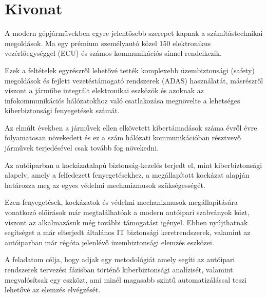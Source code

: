 \setcounter{page}{1}

\selecthungarian

\chapter*{Kivonat}

A modern gépjárművekben egyre jelentősebb szerepet kapnak a számítástechnikai megoldások. Ma egy prémium személyautó közel 150 elektronikus vezérlőegységgel (ECU) és számos kommunikációs sínnel rendelkezik. 

Ezek a feltételek egyrészről lehetővé tették komplexebb üzembiztonsági (safety) megoldások és fejlett vezetéstámogató rendszerek (ADAS) használatát, másrészről viszont a járműbe integrált elektronikai eszközök és azoknak az infokommunikációs hálózatokhoz való csatlakozása megnövelte a lehetséges kiberbiztonsági fenyegetések számát.

Az elmúlt években a járművek ellen elkövetett kibertámadások száma évről évre folyamatosan növekedett és ez a szám hálózati kommunikációban résztvevő járművek terjedésével csak tovább fog növekedni.

Az autóiparban a kockázatalapú biztonság-kezelés terjedt el, mint kiberbiztonsági alapelv, amely a felfedezett fenyegetésekhez, a megállapított kockázat alapján határozza meg az egyes védelmi mechanizmusok szükségességét.

Ezen fenyegetések, kockázatok és védelmi mechanizmusok megállapítására vonatkozó előírások már megtalálhatóak a modern autóipari szabványok közt, viszont az alkalmazásuk még további támogatást igényel. Ebben nyújthatnak segítséget a már elterjedt általános IT biztonsági keretrendszerek, valamint az autóiparban már régóta jelenlévő üzembiztonsági elemzés eszközei.

A feladatom célja, hogy adjak egy metodológiát amely segíti az autóipari rendszerek tervezési fázisban történő kiberbiztonsági analízisét, valamint megvalósítsak egy eszközt, ami minél magasabb szintű automatizálással teszi lehetővé az elemzés elvégzését. 

\vfill
\selectenglish



